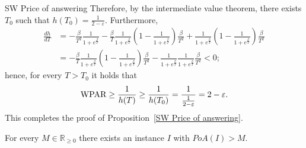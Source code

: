 \begin{proofof}{SW Price of answering}
Therefore, by the intermediate value theorem, there exists $T_0$ such that $h(T_0) = \frac{1}{2-\varepsilon}$. 
Furthermore,
\begin{align*}
\frac{dh}{dT} &= -\frac{\beta}{T^2} \frac{1}{1 + e^{\frac{\beta}{T}}} - \frac{\beta}{T}\frac{1}{1 + e^{\frac{\beta}{T}}} \left(1 - \frac{1}{1 + e^{\frac{\beta}{T}}}\right) \frac{\beta}{T^2} + \frac{1}{1 + e^{\frac{\beta}{T}}} \left( 1- \frac{1}{1 + e^{\frac{\beta}{T}}}\right) \frac{\beta}{T^2} \\
&= - \frac{\beta}{T}\frac{1}{1 + e^{\frac{\beta}{T}}} \left(1 - \frac{1}{1 + e^{\frac{\beta}{T}}}\right) \frac{\beta}{T^2} - \frac{1}{1 + e^{\frac{\beta}{T}}} \frac{1}{1 + e^{\frac{\beta}{T}}} \frac{\beta}{T^2} < 0;
\end{align*}
hence, for every $T > T_0$ it holds that 
\begin{align*}
\textnormal{WPAR} \geq \frac{1}{h(T)} \geq \frac{1}{h(T_0)} = \frac{1}{\frac{1}{2 - \varepsilon}} = 2 - \varepsilon.
\end{align*}
This completes the proof of Proposition~\ref{SW Price of answering}.
\end{proofof}










\begin{theorem} \label{PoA lower bound}
For every $M \in \mathbb{R}_{\geq 0}$ there exists an instance $I$ with $PoA(I) > M$.
\end{theorem}

